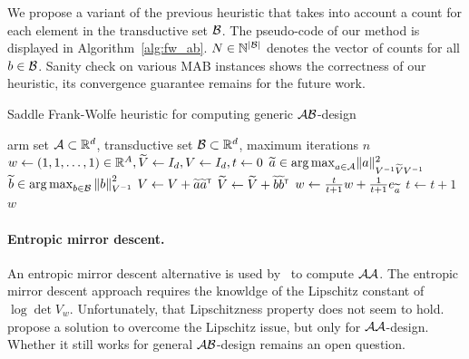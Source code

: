 We propose a variant of the previous heuristic that takes into account a count for each element in the transductive set $\mathcal{B}$. The pseudo-code of our method is displayed in Algorithm~\ref{alg:fw_ab}. $N\in{\mathbb N}^{|\mathcal{B}|}$ denotes the vector of counts for all $b\in\mathcal{B}$. Sanity check on various MAB instances shows the correctness of our heuristic, its convergence guarantee remains for the future work.


\begin{algorithm}[ht]
\centering
\caption{Saddle Frank-Wolfe heuristic for computing generic $\mathcal{A}\mathcal{B}$-design}
\label{alg:fw_ab}
\begin{algorithmic}
    arm set $\mathcal{A}\subset\mathbb{R}^d$, transductive set $\mathcal{B}\subset\mathbb{R}^d$, maximum iterations $n$
    $w \leftarrow{} (1, 1, \ldots, 1)\in\mathbb{R}^A, \widetilde{V} \leftarrow{} I_d, V \leftarrow{} I_d, t \leftarrow{} 0$
        \State $\widetilde{a}\in\operatorname*{arg\,max}_{a\in\mathcal{A}}  \lVert a\rVert_{V^{-1} \widetilde{V} V^{-1} }^2$
        \State $\widetilde{b}\in\operatorname*{arg\,max}_{b\in\mathcal{B}}\left\lVert b\right\rVert^2_{V^{-1}}$
        \State $V \leftarrow{} V + \widetilde{a}\widetilde{a}^{\mathsf{\scriptscriptstyle T}}$
		\State $\widetilde{V} \leftarrow{} \widetilde{V} + \widetilde{b}\widetilde{b}^{\mathsf{\scriptscriptstyle T}}$
        \State $w \leftarrow{} \frac{t}{t+1}w+\frac{1}{t+1}e_{\widetilde{a}}$
        \State $t \leftarrow{} t+1$
   \EndWhile
    $w$
\end{algorithmic}
\end{algorithm}

\paragraph{Entropic mirror descent.}
An entropic mirror descent alternative is used by~\citet{tao2018alba} to compute $\mathcal{A}\mathcal{A}$. The entropic mirror descent approach requires the knowldge of the Lipschitz constant of $\log\det V_w$. Unfortunately, that Lipschitzness property does not seem to hold. \citet{lu2018convex} propose a solution to overcome the Lipschitz issue, but only for $\mathcal{A}\mathcal{A}$-design. Whether it still works for general $\mathcal{A}\mathcal{B}$-design remains an open question.

